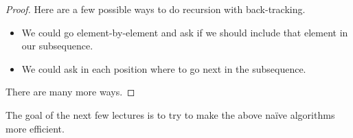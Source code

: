 \documentclass{article}
\begin{document}
\begin{proof}
	Here are a few possible ways to do recursion with back-tracking.
	\begin{itemize}
		\item We could go element-by-element and ask if we should include that element in our subsequence.
		\item We could ask in each position where to go next in the subsequence.
	\end{itemize}
	There are many more ways.
\end{proof}
The goal of the next few lectures is to try to make the above na\"ive algorithms more efficient.
\end{document}
